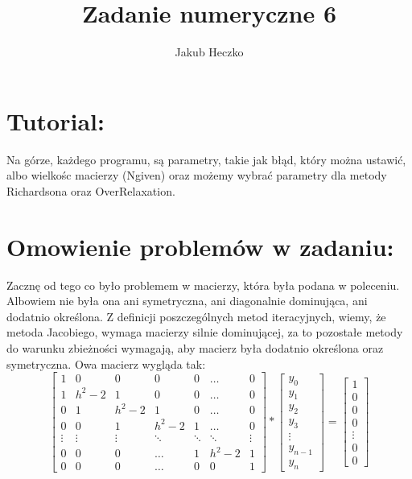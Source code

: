 \documentclass[12pt]{article}
\begin{document}
\title{{\Large}Zadanie numeryczne 6}
\date{}
\author{Jakub Heczko}

\maketitle

\section{Tutorial:}
Na górze, każdego programu, są parametry, takie jak błąd, który można ustawić, albo wielkośc macierzy (Ngiven) oraz możemy wybrać parametry dla metody Richardsona oraz OverRelaxation. 
\section{Omowienie problemów w zadaniu:}
Zacznę od tego co było problemem w macierzy, która była podana w poleceniu. Albowiem nie była ona ani symetryczna, ani diagonalnie dominująca, ani dodatnio określona. Z definicji poszczególnych metod iteracyjnych, wiemy, że metoda Jacobiego, wymaga macierzy silnie dominującej, za to pozostałe metody do warunku zbieżności wymagają, aby macierz była dodatnio określona oraz symetryczna. Owa macierz wygląda tak:
\[
\begin{bmatrix}
    1 & 0 & 0 & 0 & 0 & \dots & 0\\
    1 & h^{2}-2 & 1 & 0 & 0 & \dots & 0\\ 
    0 & 1 & h^{2}-2 & 1 & 0 & \dots & 0\\
    0 & 0 & 1 & h^{2}-2 & 1 &\dots & 0\\
    \vdots & \vdots & \vdots & \ddots & \ddots & \ddots & \vdots\\
    0 & 0 & 0 & \hdots & 1 & h^{2}-2 & 1\\
    0 & 0 & 0 & \hdots & 0 & 0 & 1
\end{bmatrix}
*
\begin{bmatrix}
    y_{0}\\
    y_{1}\\
    y_{2}\\
    y_{3}\\
    \vdots\\
    y_{n-1}\\
    y_{n}
\end{bmatrix}
=
\begin{bmatrix}
    1\\
    0\\
    0\\
    0\\
    \vdots\\
    0\\
    0
\end{bmatrix}
\]
\end{document}
